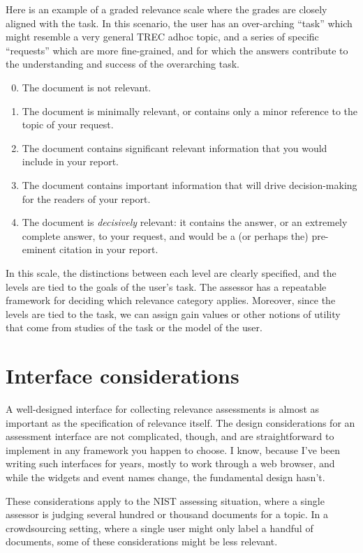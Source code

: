 \documentclass[nobib]{tufte-book}
\begin{document}
Here is an example of a graded relevance scale where the grades are closely aligned with the task.  In this scenario, the user has an over-arching ``task'' which might resemble a very general TREC adhoc topic, and a series of specific ``requests'' which are more fine-grained, and for which the answers contribute to the understanding and success of the overarching task.

\begin{enumerate}
\setcounter{enumi}{-1}   
    \item The document is not relevant.
    \item The document is minimally relevant, or contains only a minor reference to the topic of your request.
    \item The document contains significant relevant information that you would include in your report.
    \item The document contains important information that will drive decision-making for the readers of your report.
    \item The document is {\em decisively} relevant: it contains the answer, or an extremely complete answer, to your request, and would be a (or perhaps the) pre-eminent citation in your report.
\end{enumerate}

In this scale, the distinctions between each level are clearly specified, and the levels are tied to the goals of the user's task.  The assessor has a repeatable framework for deciding which relevance category applies.  Moreover, since the levels are tied to the task, we can assign gain values or other notions of utility that come from studies of the task or the model of the user.

\section{Interface considerations}

A well-designed interface for collecting relevance assessments is almost as important as the specification of relevance itself.  The design considerations for an assessment interface are not complicated, though, and are straightforward to implement in any framework you happen to choose.  I know, because I've been writing such interfaces for years, mostly to work through a web browser, and while the widgets and event names change, the fundamental design hasn't.

These considerations apply to the NIST assessing situation, where a single assessor is judging several hundred or thousand documents for a topic.  In a crowdsourcing setting, where a single user might only label a handful of documents, some of these considerations might be less relevant.
\end{document}

